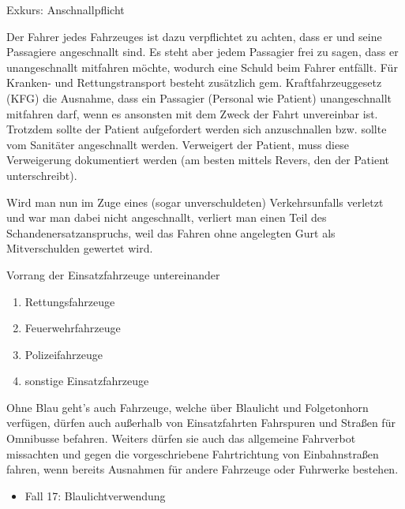\begin{Synopsis}
\end{Synopsis}


\Text
{{Exkurs: Anschnallpflicht}}%
{%
Der Fahrer jedes Fahrzeuges ist dazu verpflichtet zu
achten, dass er und seine Passagiere angeschnallt
sind. Es steht aber jedem Passagier
frei zu sagen, dass er unangeschnallt mitfahren möchte,
wodurch eine Schuld beim Fahrer entfällt. Für Kranken- und
Rettungstransport besteht zusätzlich gem.
Kraftfahrzeuggesetz (KFG) die Ausnahme, dass ein Passagier
(Personal wie Patient) unangeschnallt mitfahren darf, wenn
es ansonsten mit dem Zweck der Fahrt unvereinbar
ist. Trotzdem sollte
der Patient aufgefordert werden sich anzuschnallen bzw.
sollte vom Sanitäter angeschnallt werden.
Verweigert der Patient, muss diese Verweigerung dokumentiert
werden (am besten mittels Revers, den der Patient
unterschreibt).

Wird man nun im Zuge eines (sogar unverschuldeten)
Verkehrsunfalls verletzt und war man dabei nicht
angeschnallt, verliert man einen Teil des
Schandenersatzanspruchs, weil das Fahren ohne angelegten
Gurt als Mitverschulden gewertet wird.
}%


\Text
{Vorrang der Einsatzfahrzeuge untereinander}%
{%
\begin{enumerate}
    \item Rettungsfahrzeuge 
    \item Feuerwehrfahrzeuge
    \item Polizeifahrzeuge
    \item sonstige Einsatzfahrzeuge 
\end{enumerate}
}%



\Text
{Ohne Blau geht's auch}%
{%
Fahrzeuge, welche über Blaulicht und Folgetonhorn verfügen,
dürfen auch außerhalb von Einsatzfahrten Fahrspuren und
Straßen für Omnibusse befahren. Weiters dürfen sie auch das
allgemeine Fahrverbot missachten und gegen die
vorgeschriebene Fahrtrichtung von Einbahnstraßen
fahren, wenn bereits Ausnahmen für
andere Fahrzeuge oder Fuhrwerke
bestehen.
}%




{
\begin{itemize}
  \item Fall 17: Blaulichtverwendung 
  \dotfill{}
\end{itemize}
}
{}
{}
{}
{}


\ChapterEnd
